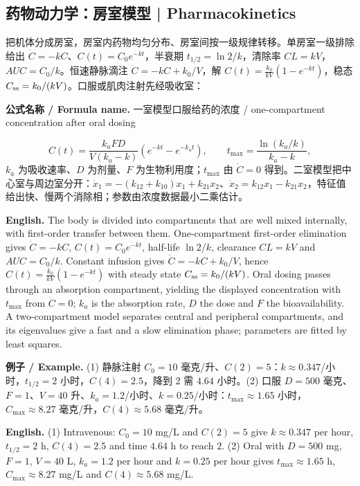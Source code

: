 \documentclass[UTF8,11pt,a4paper]{ctexart}
\newcommand{\EN}[1]{\par\noindent\textbf{English.} #1\par}
\newcommand{\FORMULA}[2]{\par\noindent\textbf{公式名称 / Formula name.} #1 / #2\par}
\newcommand{\EX}[2]{\par\noindent\textbf{例子 / Example.} #1\par\EN{#2}}
\begin{document}
\subsection{药物动力学：房室模型 | Pharmacokinetics}
把机体分成房室，房室内药物均匀分布、房室间按一级规律转移。单房室一级排除给出 $\dot C=-kC$、$C(t)=C_0e^{-kt}$，半衰期 $t_{1/2}=\ln2/k$，清除率 $CL=kV$，$AUC=C_0/k$。恒速静脉滴注 $\dot C=-kC+k_0/V$，解 $C(t)=\frac{k_0}{kV}(1-e^{-kt})$，稳态 $C_{\rm ss}=k_0/(kV)$。口服或肌肉注射先经吸收室：
\FORMULA{一室模型口服给药的浓度}{one-compartment concentration after oral dosing}
\[
C(t)=\frac{k_aFD}{V(k_a-k)}\left(e^{-kt}-e^{-k_at}\right),
\qquad
t_{\max}=\frac{\ln(k_a/k)}{k_a-k},
\]
$k_a$ 为吸收速率、$D$ 为剂量、$F$ 为生物利用度；$t_{\max}$ 由 $\dot C=0$ 得到。二室模型把中心室与周边室分开：$\dot x_1=-(k_{12}+k_{10})x_1+k_{21}x_2$、$\dot x_2=k_{12}x_1-k_{21}x_2$，特征值给出快、慢两个消除相；参数由浓度数据最小二乘估计。
\EN{The body is divided into compartments that are well mixed internally, with first-order transfer between them. One-compartment first-order elimination gives $\dot C=-kC$, $C(t)=C_0e^{-kt}$, half-life $\ln2/k$, clearance $CL=kV$ and $AUC=C_0/k$. Constant infusion gives $\dot C=-kC+k_0/V$, hence $C(t)=\frac{k_0}{kV}(1-e^{-kt})$ with steady state $C_{\rm ss}=k_0/(kV)$. Oral dosing passes through an absorption compartment, yielding the displayed concentration with $t_{\max}$ from $\dot C=0$; $k_a$ is the absorption rate, $D$ the dose and $F$ the bioavailability. A two-compartment model separates central and peripheral compartments, and its eigenvalues give a fast and a slow elimination phase; parameters are fitted by least squares.}
\EX{(1) 静脉注射 $C_0=10$ 毫克/升、$C(2)=5$：$k\approx0.347$/小时，$t_{1/2}=2$ 小时，$C(4)=2.5$，降到 $2$ 需 $4.64$ 小时。(2) 口服 $D=500$ 毫克、$F=1$、$V=40$ 升、$k_a=1.2$/小时、$k=0.25$/小时：$t_{\max}\approx1.65$ 小时，$C_{\max}\approx8.27$ 毫克/升，$C(4)\approx5.68$ 毫克/升。}{(1) Intravenous: $C_0=10$ mg/L and $C(2)=5$ give $k\approx0.347$ per hour, $t_{1/2}=2$ h, $C(4)=2.5$ and time $4.64$ h to reach $2$. (2) Oral with $D=500$ mg, $F=1$, $V=40$ L, $k_a=1.2$ per hour and $k=0.25$ per hour gives $t_{\max}\approx1.65$ h, $C_{\max}\approx8.27$ mg/L and $C(4)\approx5.68$ mg/L.}
\end{document}
